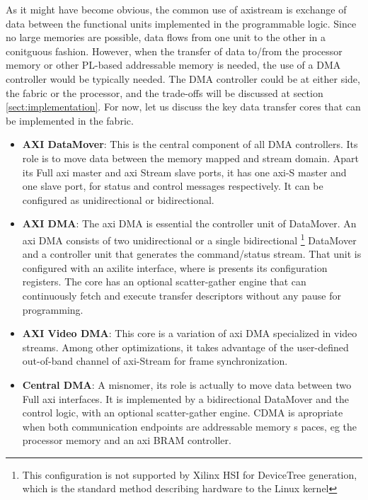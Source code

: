 As it might have become obvious, the common use of \gls{axistream} is exchange of data between the
functional units implemented in the programmable logic. Since no large memories are possible,
data flows from one unit to the other in a conitguous fashion. However, when the transfer of data
to/from the processor memory or other PL-based addressable memory is needed, the use of a DMA
controller would be typically needed. The DMA controller could be at either side, 
the fabric or the processor, and the trade-offs will be discussed at section 
\ref{sect:implementation}.
For now, let us discuss the key data transfer cores that can be implemented in the fabric.
\begin{itemize}

\item	\textbf{AXI DataMover}:
	This is the central component of all DMA controllers.
	Its role is to move data between the memory mapped and stream domain.
	Apart its Full \gls{axi} master and \gls{axi} Stream slave ports, 
	it has one \gls{axi}-S master and one slave port, 
	for status and control messages respectively.
	It can be configured as unidirectional or bidirectional.
\item	\textbf{AXI DMA}:
	The \gls{axi} DMA is essential the controller unit of DataMover. 
	An \gls{axi} DMA consists of two unidirectional or a single bidirectional
	\footnote{This configuration is not supported by Xilinx HSI for DeviceTree generation,
	which is the standard method describing hardware to the Linux kernel}
	DataMover and a controller unit that generates the command/status stream.
	That unit is configured with an \gls{axilite} interface, 
	where is presents its configuration registers.
	The core has an optional scatter-gather engine that can continuously fetch and execute
	transfer descriptors without any pause for programming.
\item	\textbf{AXI Video DMA}: 
	This core is a variation of \gls{axi} DMA specialized in video streams.
	Among other optimizations, it takes advantage of the user-defined out-of-band channel
	of \gls{axi}-Stream for frame synchronization.
\item	\textbf{Central DMA}: 
	A misnomer, its role is actually to move data between two Full \gls{axi} interfaces.
	It is implemented by a bidirectional DataMover and the control logic, with an optional
	scatter-gather engine. CDMA is apropriate when both communication endpoints are addressable
	memory s paces, eg the processor memory and an \gls{axi} BRAM controller.
\end{itemize}

